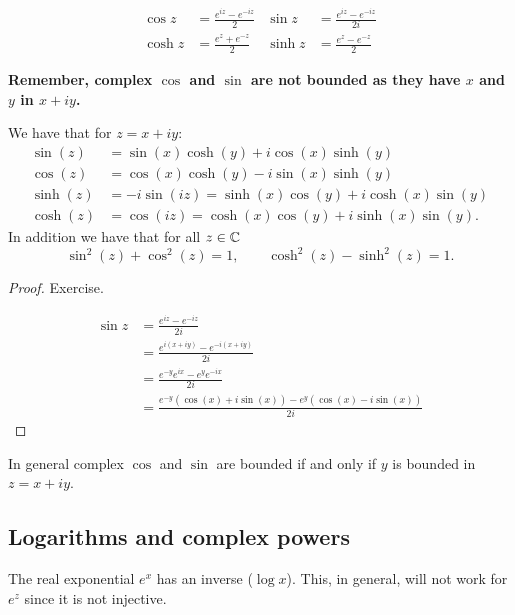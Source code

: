 \documentclass[10pt, a4paper]{article}
\begin{document}
\begin{definition}
    \begin{align*}
        \cos{z} &= \frac{e ^ {iz} - e ^ {-iz}}{2}&\sin{z} &= \frac{e ^ {iz} - e ^ {-iz}}{2i} \\
        \cosh{z} &= \frac{e ^ z + e ^ {-z}}{2}& \sinh{z} &= \frac{e ^ z - e ^ {-z}}{2}
    \end{align*}
\end{definition}
\textbf{Remember,
complex $\cos$ and $\sin$ are not bounded as they have $x$ and $y$ in $x + iy$.}


\begin{lemma}
    We have that for $z = x + iy$:
    \begin{align*}
        \sin(z) &= \sin(x)\cosh(y) + i\cos(x)\sinh(y) \\
        \cos(z) &= \cos(x)\cosh(y) - i\sin(x)\sinh(y) \\
        \sinh(z) &= -i\sin(iz) = \sinh(x)\cos(y) + i\cosh(x)\sin(y) \\
        \cosh(z) &= \cos(iz) = \cosh(x)\cos(y) + i\sinh(x)\sin(y).
    \end{align*}
    In addition we have that for all $z \in \mathbb{C}$
    \[
    \sin ^ 2(z) + \cos ^ 2(z) = 1,\qquad \cosh ^ 2(z) - \sinh ^ 2(z) = 1.
    \]

    \begin{proof}
        Exercise.

        \begin{align*}
            \sin{z} &= \frac{e ^ {iz} - e ^ {-iz}}{2i} \\
            &= \frac{e ^ {i(x + iy)} - e ^ {-i(x + iy)}}{2i} \\
            &= \frac{e ^ {-y}e ^ {ix} - e ^ {y}e ^ {-ix}}{2i} \\
            &= \frac{e ^ {-y}(\cos(x) + i\sin(x)) - e ^ {y}(\cos(x) - i\sin(x))}{2i}
        \end{align*}
    \end{proof}
\end{lemma}

In general complex $\cos$ and $\sin$ are bounded if and only if $y$ is bounded in $z = x + iy$.

\subsection{Logarithms and complex powers}


The real exponential $e ^ x$ has an inverse
($\log{x}$).
This,
in general,
will not work for $e ^ z$ since it is not injective.
\end{document}
